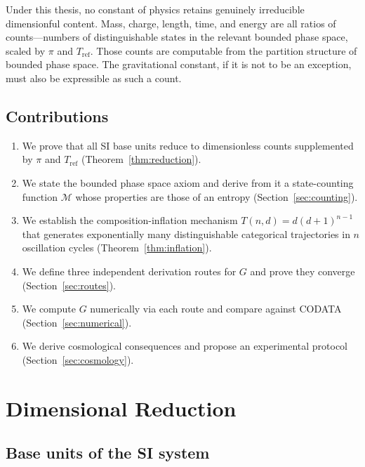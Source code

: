 \documentclass[11pt,twocolumn,a4paper]{article}
\theoremstyle{definition}
\theoremstyle{remark}
\newcommand{\Mop}{\mathcal{M}}
\newcommand{\Gnewton}{G}
\begin{document}
Under this thesis, no constant of physics retains genuinely irreducible dimensionful content. Mass, charge, length, time, and energy are all ratios of counts---numbers of distinguishable states in the relevant bounded phase space, scaled by $\pi$ and $T_\text{ref}$. Those counts are computable from the partition structure of bounded phase space. The gravitational constant, if it is not to be an exception, must also be expressible as such a count.

\subsection{Contributions}

\begin{enumerate}[nosep]
\item We prove that all SI base units reduce to dimensionless counts supplemented by $\pi$ and $T_\text{ref}$ (Theorem~\ref{thm:reduction}).
\item We state the bounded phase space axiom and derive from it a state-counting function $\Mop$ whose properties are those of an entropy (Section~\ref{sec:counting}).
\item We establish the composition-inflation mechanism $T(n,d) = d(d+1)^{n-1}$ that generates exponentially many distinguishable categorical trajectories in $n$ oscillation cycles (Theorem~\ref{thm:inflation}).
\item We define three independent derivation routes for $\Gnewton$ and prove they converge (Section~\ref{sec:routes}).
\item We compute $\Gnewton$ numerically via each route and compare against CODATA (Section~\ref{sec:numerical}).
\item We derive cosmological consequences and propose an experimental protocol (Section~\ref{sec:cosmology}).
\end{enumerate}

\section{Dimensional Reduction}
\label{sec:reduction}

\subsection{Base units of the SI system}
\end{document}

